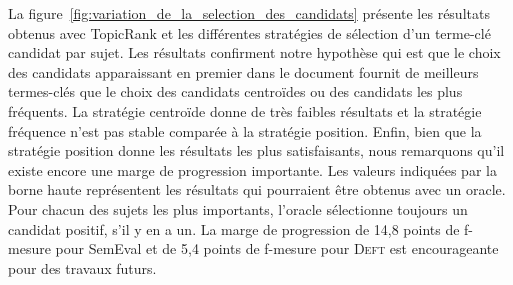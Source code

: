         La figure~\ref{fig:variation_de_la_selection_des_candidats} présente les
        résultats obtenus avec TopicRank et les différentes stratégies de
        sélection d'un terme-clé candidat par sujet. Les résultats confirment
        notre hypothèse qui est que le choix des candidats apparaissant en
        premier dans le document fournit de meilleurs termes-clés que le choix
        des candidats centroïdes ou des candidats les plus fréquents. La
        stratégie centroïde donne de très faibles résultats et la
        stratégie fréquence n'est pas stable comparée à la stratégie position.
        Enfin, bien que la stratégie position donne les résultats les plus
        satisfaisants, nous remarquons qu'il existe encore une marge de
        progression importante. Les valeurs indiquées par la borne haute
        représentent les résultats qui pourraient être obtenus avec un oracle.
        Pour chacun des sujets les plus importants, l'oracle sélectionne
        toujours un candidat positif, s'il y en a un. La marge de progression de
        14,8 points de f-mesure pour SemEval et de 5,4 points de f-mesure pour
        \textsc{Deft} est encourageante pour des travaux futurs.
